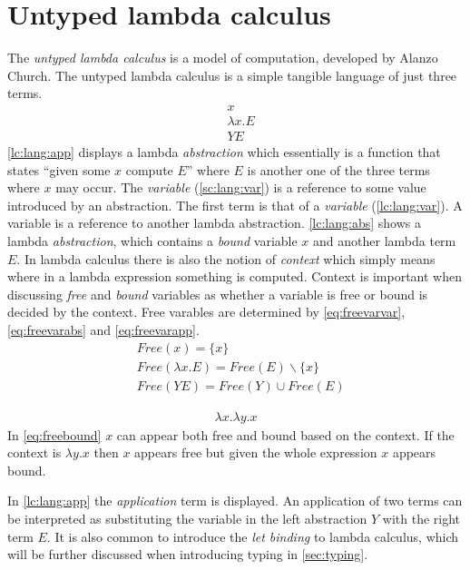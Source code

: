 \documentclass[11pt,oneside,a4paper]{report}
\begin{document}
\clearpage
\section{Untyped lambda calculus}\label{sec:lc}
The \textit{untyped lambda calculus} is a model of computation, developed by Alanzo Church\cite{church1936unsolvable}.
The untyped lambda calculus is a simple tangible language of just three terms.
\begin{align}
  &x
  \label{lc:lang:var}\\
  &\lambda x . E
  \label{lc:lang:abs}\\
  &Y E
  \label{lc:lang:app}
\end{align}
\autoref{lc:lang:app} displays a lambda \textit{abstraction} which essentially is a function that states ``given some $x$ compute $E$'' where $E$ is another one of the three terms where $x$ may occur.
The \textit{variable} (\autoref{sc:lang:var}) is a reference to some value introduced by an abstraction.
The first term is that of a \textit{variable} (\autoref{lc:lang:var}).
A variable is a reference to another lambda abstraction.
\autoref{lc:lang:abs} shows a lambda \textit{abstraction}, which contains a \textit{bound} variable $x$ and another lambda term $E$.
In lambda calculus there is also the notion of \textit{context} which simply means where in a lambda expression something is computed.
Context is important when discussing \textit{free} and \textit{bound} variables as whether a variable is free or bound is decided by the context.
Free varables are determined by \autoref{eq:freevarvar}, \autoref{eq:freevarabs} and \autoref{eq:freevarapp}.
\begin{align}
    \label{eq:freevarvar}
    &Free(x) = \{ x \}\\
    \label{eq:freevarabs}
    &Free(\lambda x . E) = Free(E) \backslash \{ x \}\\
    \label{eq:freevarapp}
    &Free(Y E) = Free(Y) \cup Free(E)
\end{align}
\begin{exmp}
    \begin{align}
        \lambda x . \lambda y . x\label{eq:freebound}
    \end{align}
    In \autoref{eq:freebound} $x$ can appear both free and bound based on the context.
    If the context is $\lambda y . x$ then $x$ appears free but given the whole expression $x$ appears bound.
\end{exmp}

In \autoref{lc:lang:app} the \textit{application} term is displayed.
An application of two terms can be interpreted as substituting the variable in the left abstraction $Y$ with the right term $E$.
It is also common to introduce the \textit{let binding} to lambda calculus, which will be further discussed when introducing typing in \autoref{sec:typing}.
\end{document}
